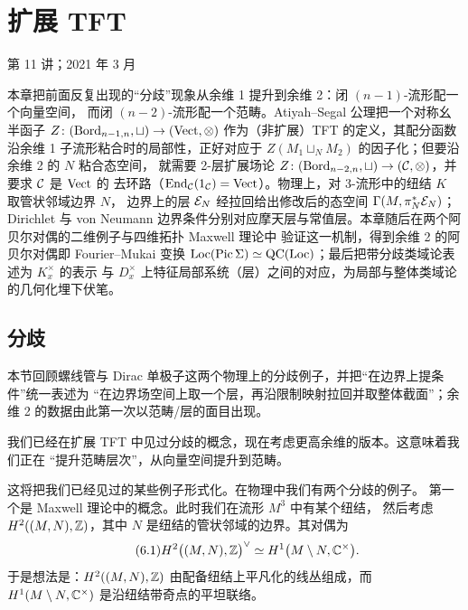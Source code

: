 \chapter{扩展 TFT}\label{ch:06}

\begin{flushright}
\small 第 11 讲；2021 年 3 月
\end{flushright}

\begin{keytakeaways}
本章把前面反复出现的“分歧”现象从余维 1 提升到余维 2：闭 $(n-1)$-流形配一个向量空间，
而闭 $(n-2)$-流形配一个范畴。Atiyah--Segal 公理把一个对称幺半函子
$Z\colon(\mathrm{Bord}_{n-1,n},\sqcup)\to(\mathrm{Vect},\otimes)$ 作为（非扩展）TFT 的定义，其配分函数沿余维 1
子流形粘合时的局部性，正好对应于 $Z(M_1\sqcup_N M_2)$ 的因子化；但要沿余维 2 的 $N$ 粘合态空间，
就需要 2-层扩展场论 $Z\colon(\mathrm{Bord}_{n-2,n},\sqcup)\to(\mathcal{C},\otimes)$，并要求 $\mathcal{C}$ 是 $\mathrm{Vect}$ 的
去环路（$\mathrm{End}_{\mathcal{C}}(1_{\mathcal{C}})=\mathrm{Vect}$）。物理上，对 3-流形中的纽结 $K$ 取管状邻域边界 $N$，
边界上的层 $\mathcal{E}_N$ 经拉回给出修改后的态空间 $\Gamma(M,\pi_N^*\mathcal{E}_N)$；Dirichlet 与 von Neumann
边界条件分别对应摩天层与常值层。本章随后在两个阿贝尔对偶的二维例子与四维拓扑 Maxwell 理论中
验证这一机制，得到余维 2 的阿贝尔对偶即 Fourier--Mukai 变换
$\mathrm{Loc}(\operatorname{Pic}\Sigma)\simeq\mathrm{QC}(\mathrm{Loc})$；最后把带分歧类域论表述为 $K_x^\times$ 的表示
与 $D_x^\times$ 上特征局部系统（层）之间的对应，为局部与整体类域论的几何化埋下伏笔。
\end{keytakeaways}

\section{分歧}

\begin{sectionkey}
本节回顾螺线管与 Dirac 单极子这两个物理上的分歧例子，并把“在边界上提条件”统一表述为
“在边界场空间上取一个层，再沿限制映射拉回并取整体截面”；余维 2 的数据由此第一次以范畴/层的面目出现。
\end{sectionkey}

我们已经在扩展 TFT 中见过分歧的概念，现在考虑更高余维的版本。这意味着我们正在
“提升范畴层次”，从向量空间提升到范畴。

这将把我们已经见过的某些例子形式化。在物理中我们有两个分歧的例子。
第一个是 Maxwell 理论中的概念。此时我们在流形 $M^3$ 中有某个纽结，
然后考虑 $H^2((M,N),\mathbb{Z})$，其中 $N$ 是纽结的管状邻域的边界。其对偶为
\begin{equation}\tag{6.1}\label{eq:6.1}
H^2\bigl((M,N),\mathbb{Z}\bigr)^{\vee}\simeq H^1\bigl(M\setminus N,\mathbb{C}^{\times}\bigr).
\end{equation}
于是想法是：$H^2((M,N),\mathbb{Z})$ 由配备纽结上平凡化的线丛组成，而
$H^1(M\setminus N,\mathbb{C}^{\times})$ 是沿纽结带奇点的平坦联络。

